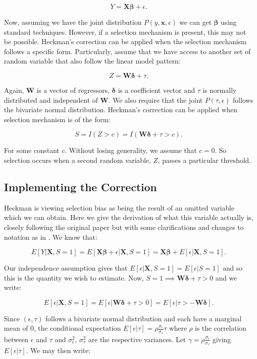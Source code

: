 \documentclass[12pt,twoside]{reedthesis}
\theoremstyle{definition}
\begin{document}
$$Y = \mathbf{X} \boldsymbol{\beta} + \epsilon.$$

Now, assuming we have the joint distribution $P(y, \mathbf{x}, \epsilon)$ we can get $\mathbf{\beta}$ using standard techniques. However, if a selection mechanism is present, this may not be possible. Heckman's correction can be applied when the selection mechanism follows a specific form. Particularly, assume that we have access to another set of random variable that also follow the linear model pattern: 

$$Z = \mathbf{W} \boldsymbol{\delta} + \tau.$$

Again, $\mathbf{W}$ is a vector of regressors, $\boldsymbol{\delta}$ is a coefficient vector and $\tau$ is normally distributed and independent of $\mathbf{W}$. We also require that the joint $P(\tau, \epsilon)$ follows the bivariate normal distribution. Heckman's correction can be applied when selection mechanism is of the form:

$$S = I(Z > c) = I( \mathbf{W} \boldsymbol{\delta} + \tau > c).$$ 

For some constant $c$. Without losing generality, we assume that $c = 0$. So selection occurs when a second random variable, $Z$,  passes a particular threshold. 

\subsection{Implementing the Correction}

Heckman is viewing selection bias as being the result of an omitted variable which we can obtain. Here we give the derivation of what this variable actually is, closely following the original paper but with some clarifications and changes to notation as in \citep{Jin}. We know that:

$$E[Y | \mathbf{X}, S = 1] = E[ \mathbf{X} \boldsymbol{\beta} + \epsilon | \mathbf{X}, S = 1] = \mathbf{X} \boldsymbol{\beta} + E[\epsilon |  \mathbf{X}, S = 1].$$

Our independence assumption gives that $ E[\epsilon |  \mathbf{X}, S = 1] =  E[\epsilon |  S = 1]$ and so this is the quantity we wish to estimate. Now, $S=1 \implies  \mathbf{W} \boldsymbol{\delta} + \tau > 0$ and we write:  

$$E[\epsilon |  \mathbf{X}, S = 1] = E[\epsilon | \mathbf{W} \boldsymbol{\delta}+ \tau > 0] = E[\epsilon |  \tau > - \mathbf{W} \boldsymbol{\delta}].$$

Since $(\epsilon, \tau)$ follows a bivariate normal distribution and each have a marginal mean of $0$, the conditional expectation $E[\epsilon | \tau] = \rho \frac{\sigma_{\epsilon}}{\sigma_{\tau}} \tau$ where $\rho$ is the correlation between $\epsilon$ and $\tau$ and $\sigma^2_{\epsilon}$, $\sigma^2_{\tau}$ are the respective variances. Let $\gamma  = \rho \frac{\sigma_{\epsilon}}{\sigma_{\tau}}$ giving $E[\epsilon | \tau]$. We may then write:	
\end{document}
